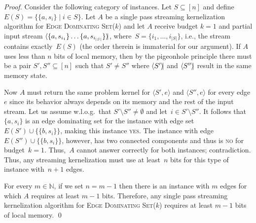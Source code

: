 \documentclass[draft,a4paper]{llncs}
\newcommand{\yes}{\textsc{yes}\xspace}
\newcommand{\no}{\textsc{no}\xspace}
\newcommand{\halt}{\mathbin{\rangle\mkern-4mu|}}
\newcommand{\EDSk}{\textsc{Edge Dominating Set($k$)}\xspace}
\begin{document}
\begin{proof}
Consider the following category of instances. Let $S \subseteq [n]$ and define ~$E(S)=\{\{a,s_i\}\mid i\in S\}$. Let $A$ be a single pass streaming kernelization algorithm for \EDSk and let $A$ receive budget $k=1$ and partial input stream $\langle \{a, s_{i_1}\}\ldots \{a, s_{i_{|S|}}\} \halt$,
where~$S=\{i_1,\ldots,i_{|S|}\}$, i.e., the stream contains exactly~$E(S)$ (the order therein is immaterial for our argument).
If $A$ uses less than $n$ bits of local memory, then by the pigeonhole principle there must be a pair $S', S'' \subseteq [n]$ such that $S' \neq S''$ where $\langle S' \halt$ and $\langle S'' \halt$ result in the same memory state. 

Now $A$ must return the same problem kernel for $\langle S', e \rangle$ and $\langle S'', e \rangle$ for every edge $e$ since its behavior always depends on its memory and the rest of the input stream. Let us assume w.l.o.g.\ that $S' \setminus S'' \neq \emptyset$ and let~$i\in S'\setminus S''$. It follows that~$\{a,s_i\}$ is an edge dominating set for the instance with edge set~$E(S')\cup\{\{b,s_i\}\}$, making this instance \yes. The instance with edge~$E(S'')\cup\{\{b,s_i\}\}$, however, has two connected components and thus is \no for budget~$k=1$. Thus,~$A$ cannot answer correctly for both instances; contradiction. Thus, any streaming kernelization must use at least~$n$ bits for this type of instance with~$n+1$ edges.

For every $m \in \mathbb{N}$, if we set $n = m-1$ then there is an instance with $m$ edges for which $A$ requires at least $m-1$ bits. Therefore, any single pass streaming kernelization algorithm for \EDSk requires at least $m-1$ bits of local memory. \qed \end{proof}
\end{document}
